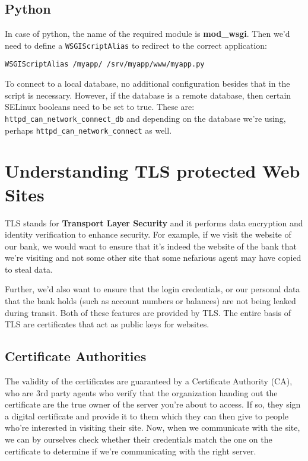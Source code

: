 \subsection{Python}
In case of python, the name of the required module is \textbf{mod\_wsgi}. Then we'd need to define a \verb|WSGIScriptAlias| to redirect to the correct application:

\vspace{-15pt}
\begin{verbatim}
WSGIScriptAlias	/myapp/	/srv/myapp/www/myapp.py
\end{verbatim}
\vspace{-10pt}	

\noindent
To connect to a local database, no additional configuration besides that in the script is necessary. However, if the database is a remote database, then certain SELinux booleans need to be set to true. These are: \verb|httpd_can_network_connect_db| and depending on the database we're using, perhaps \verb|httpd_can_network_connect| as well.

	\section{Understanding TLS protected Web Sites} 
TLS stands for \textbf{Transport Layer Security} and it performs data encryption and identity verification to enhance security. For example, if we visit the website of our bank, we would want to ensure that it's indeed the website of the bank that we're visiting and not some other site that some nefarious agent may have copied to steal data. 

Further, we'd also want to ensure that the login credentials, or our personal data that the bank holds (such as account numbers or balances) are not being leaked during transit. Both of these features are provided by TLS. The entire basis of TLS are certificates that act as public keys for websites. 

\subsection{Certificate Authorities}
The validity of the certificates are guaranteed by a Certificate Authority (CA), who are 3rd party agents who verify that the organization handing out the certificate are the true owner of the server you're about to access. If so, they sign a digital certificate and provide it to them which they can then give to people who're interested in visiting their site. Now, when we communicate with the site, we can by ourselves check whether their credentials match the one on the certificate to determine if we're communicating with the right server. 

